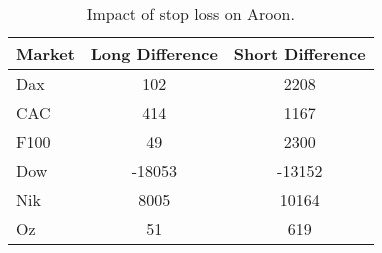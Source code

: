 \begin{table}[ht]
\centering
\caption[Impact of using stop loss with Aroon trend indicator.]{Impact of stop loss on Aroon.} 
\label{tab:aroon_results_sloss_diff}
\begin{tabular}{lcc}
  \toprule Market & Long Difference & Short Difference \\ 
  \midrule Dax & 102 & 2208 \\ 
  CAC & 414 & 1167 \\ 
  F100 & 49 & 2300 \\ 
  Dow & -18053 & -13152 \\ 
  Nik & 8005 & 10164 \\ 
  Oz & 51 & 619 \\ 
   \bottomrule \end{tabular}
\end{table}
